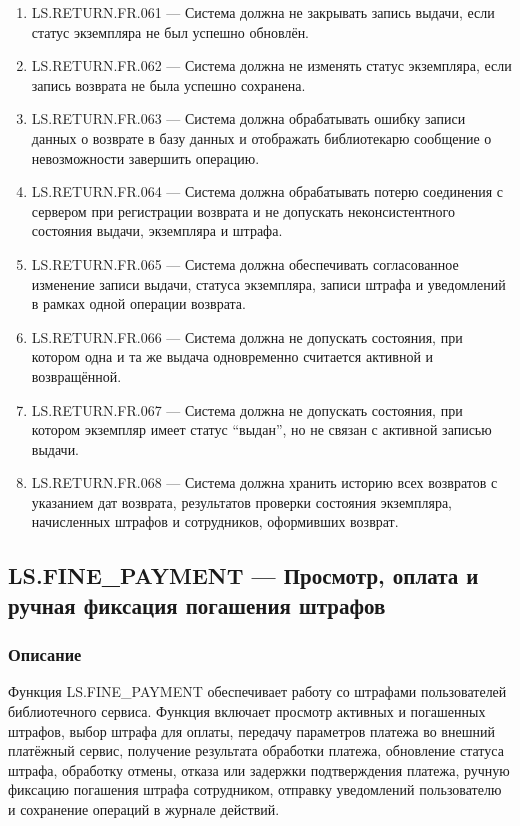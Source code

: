 \documentclass[12pt,a4paper]{article}
\begin{document}
\begin{enumerate}
		\item LS.RETURN.FR.061 --- Система должна не закрывать запись выдачи, если статус
		экземпляра не был успешно обновлён.
		
		\item LS.RETURN.FR.062 --- Система должна не изменять статус экземпляра, если
		запись возврата не была успешно сохранена.
		
		\item LS.RETURN.FR.063 --- Система должна обрабатывать ошибку записи данных
		о возврате в базу данных и отображать библиотекарю сообщение о невозможности
		завершить операцию.
		
		\item LS.RETURN.FR.064 --- Система должна обрабатывать потерю соединения с сервером
		при регистрации возврата и не допускать неконсистентного состояния выдачи,
		экземпляра и штрафа.
		
		\item LS.RETURN.FR.065 --- Система должна обеспечивать согласованное изменение
		записи выдачи, статуса экземпляра, записи штрафа и уведомлений в рамках одной
		операции возврата.
		
		\item LS.RETURN.FR.066 --- Система должна не допускать состояния, при котором
		одна и та же выдача одновременно считается активной и возвращённой.
		
		\item LS.RETURN.FR.067 --- Система должна не допускать состояния, при котором
		экземпляр имеет статус ``выдан'', но не связан с активной записью выдачи.
		
		\item LS.RETURN.FR.068 --- Система должна хранить историю всех возвратов с указанием
		дат возврата, результатов проверки состояния экземпляра, начисленных штрафов
		и сотрудников, оформивших возврат.
	\end{enumerate}
	
	\subsection{LS.FINE\_PAYMENT --- Просмотр, оплата и ручная фиксация погашения штрафов}
	
	\subsubsection{Описание}
	
	Функция LS.FINE\_PAYMENT обеспечивает работу со штрафами пользователей библиотечного
	сервиса. Функция включает просмотр активных и погашенных штрафов, выбор
	штрафа для оплаты, передачу параметров платежа во внешний платёжный сервис,
	получение результата обработки платежа, обновление статуса штрафа, обработку
	отмены, отказа или задержки подтверждения платежа, ручную фиксацию погашения
	штрафа сотрудником, отправку уведомлений пользователю и сохранение операций
	в журнале действий.
	
\end{document}
